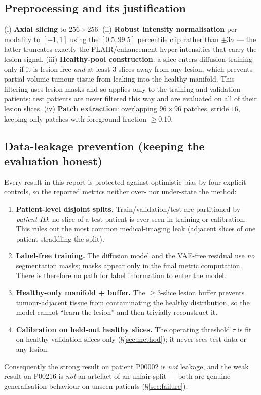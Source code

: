 \documentclass[12pt, a4paper]{article}
\theoremstyle{definition}\newtheorem{definition}{Definition}
\begin{document}
\subsection{Preprocessing and its justification}
(i) \textbf{Axial slicing} to $256{\times}256$. (ii) \textbf{Robust intensity
normalisation} per modality to $[-1,1]$ using the $[0.5,99.5]$ percentile clip
rather than $\pm3\sigma$ --- the latter truncates exactly the FLAIR/enhancement
hyper-intensities that carry the lesion signal. (iii) \textbf{Healthy-pool
construction}: a slice enters diffusion training only if it is lesion-free \emph{and}
at least $3$ slices away from any lesion, which prevents partial-volume tumour tissue
from leaking into the healthy manifold. This filtering uses lesion masks and so applies
only to the training and validation patients; test patients are never filtered this way
and are evaluated on all of their lesion slices. (iv) \textbf{Patch extraction}:
overlapping $96{\times}96$ patches, stride $16$, keeping only patches with foreground
fraction $\ge0.10$.

\subsection{Data-leakage prevention (keeping the evaluation honest)}
\label{sec:leakage}
Every result in this report is protected against optimistic bias by four explicit
controls, so the reported metrics neither over- nor under-state the method:
\begin{enumerate}[leftmargin=1.5em,itemsep=1pt]
\item \textbf{Patient-level disjoint splits.} Train/validation/test are partitioned
by \emph{patient ID}; no slice of a test patient is ever seen in training or
calibration. This rules out the most common medical-imaging leak (adjacent slices
of one patient straddling the split).
\item \textbf{Label-free training.} The diffusion model and the VAE-free residual
use \emph{no} segmentation masks; masks appear only in the final metric computation.
There is therefore no path for label information to enter the model.
\item \textbf{Healthy-only manifold + buffer.} The $\ge3$-slice lesion buffer
prevents tumour-adjacent tissue from contaminating the healthy distribution, so the
model cannot ``learn the lesion'' and then trivially reconstruct it.
\item \textbf{Calibration on held-out healthy slices.} The operating threshold
$\tau$ is fit on healthy validation slices only (\S\ref{sec:method}); it never sees
test data or any lesion.
\end{enumerate}
Consequently the strong result on patient P00002 is \emph{not} leakage, and the
weak result on P00216 is \emph{not} an artefact of an unfair split --- both are
genuine generalisation behaviour on unseen patients (\S\ref{sec:failure}).
\end{document}
